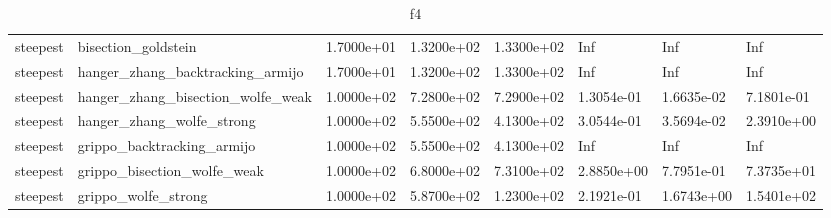 \documentclass[a4paper,11pt]{article}
\numberwithin{equation}{section} %
\begin{document}
\begin{table}[h!]
{\begin{tabular}{|l|l|l|l|l|l|l|l|}
        steepest & bisection\_goldstein & 1.7000e+01 & 1.3200e+02 & 1.3300e+02 & Inf & Inf & Inf \\
        steepest & hanger\_zhang\_backtracking\_armijo & 1.7000e+01 & 1.3200e+02 & 1.3300e+02 & Inf & Inf & Inf \\
        steepest & hanger\_zhang\_bisection\_wolfe\_weak & 1.0000e+02 & 7.2800e+02 & 7.2900e+02 & 1.3054e-01 & 1.6635e-02 & 7.1801e-01 \\
        steepest & hanger\_zhang\_wolfe\_strong & 1.0000e+02 & 5.5500e+02 & 4.1300e+02 & 3.0544e-01 & 3.5694e-02 & 2.3910e+00 \\
        steepest & grippo\_backtracking\_armijo & 1.0000e+02 & 5.5500e+02 & 4.1300e+02 & Inf & Inf & Inf \\
        steepest & grippo\_bisection\_wolfe\_weak & 1.0000e+02 & 6.8000e+02 & 7.3100e+02 & 2.8850e+00 & 7.7951e-01 & 7.3735e+01 \\
        steepest & grippo\_wolfe\_strong & 1.0000e+02 & 5.8700e+02 & 1.2300e+02 & 2.1921e-01 & 1.6743e+00 & 1.5401e+02 \\

\end{tabular}}
\caption{f4}
\label{table:f4}
\end{table}
\end{document}
